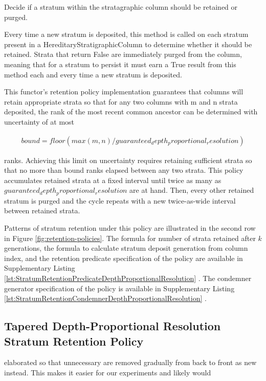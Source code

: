 Decide if a stratum within the stratagraphic column should be
retained or purged.

Every time a new stratum is deposited, this method is called on each
stratum present in a HereditaryStratigraphicColumn to determine whether
it should be retained. Strata that return False are immediately purged
from the column, meaning that for a stratum to persist it must earn a
True result from this method each and every time a new stratum is
deposited.

This functor's retention policy implementation guarantees that columns
will retain appropriate strata so that for any two columns with m and n
strata deposited, the rank of the most recent common ancestor can be
determined with uncertainty of at most

\begin{align*}
    bound = floor(max(m, n) / guaranteed_depth_proportional_resolution)
\end{align*}

ranks. Achieving this limit on uncertainty requires retaining sufficient
strata so that no more than bound ranks elapsed between any two strata.
This policy accumulates retained strata at a fixed interval until twice
as many as $guaranteed_depth_proportional_resolution$ are at hand. Then,
every other retained stratum is purged and the cycle repeats with a new
twice-as-wide interval between retained strata.

Patterns of stratum retention under this policy are illustrated in the second row in Figure \ref{fig:retention-policies}.
The formula for number of strata retained after $k$ generations, the formula to calculate stratum deposit generation from column index, and the retention predicate specification of the policy are available in Supplementary Listing \ref{lst:StratumRetentionPredicateDepthProportionalResolution} \citep{moreno2022hstratconceptsupplement}.
The condemner generator specification of the policy is available in Supplementary Listing \ref{lst:StratumRetentionCondemnerDepthProportionalResolution} \citep{moreno2022hstratconceptsupplement}.

\subsection{Tapered Depth-Proportional Resolution Stratum Retention Policy}

elaborated so that unnecessary are removed gradually from back to front as new instead.
This makes it easier for our experiments and likely would

